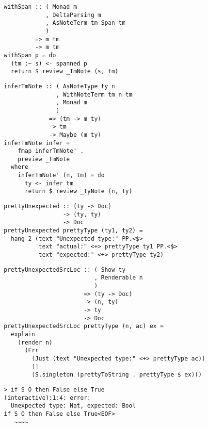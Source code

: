 \documentclass{beamer}
\begin{document}
\begin{frame}[fragile]
  \begin{verbatim}
withSpan :: ( Monad m
            , DeltaParsing m
            , AsNoteTerm tm Span tm
            )
         => m tm
         -> m tm
withSpan p = do
  (tm :~ s) <- spanned p
  return $ review _TmNote (s, tm)
  \end{verbatim}
\end{frame} 

\begin{frame}[fragile]
  \begin{verbatim}
inferTmNote :: ( AsNoteType ty n
               , WithNoteTerm tm n tm
               , Monad m
               )
             => (tm -> m ty)
             -> tm
             -> Maybe (m ty)
inferTmNote infer =
    fmap inferTmNote' .
    preview _TmNote
  where
    inferTmNote' (n, tm) = do
      ty <- infer tm
      return $ review _TyNote (n, ty)
  \end{verbatim}
\end{frame} 

\begin{frame}[fragile]
  \begin{verbatim}
prettyUnexpected :: (ty -> Doc)
                 -> (ty, ty)
                 -> Doc
prettyUnexpected prettyType (ty1, ty2) =
  hang 2 (text "Unexpected type:" PP.<$>
          text "actual:" <+> prettyType ty1 PP.<$>
          text "expected:" <+> prettyType ty2)
  \end{verbatim}
\end{frame} 

\begin{frame}[fragile]
  \begin{verbatim}
prettyUnexpectedSrcLoc :: ( Show ty
                          , Renderable n
                          )
                       => (ty -> Doc)
                       -> (n, ty)
                       -> ty
                       -> Doc
prettyUnexpectedSrcLoc prettyType (n, ac) ex =
  explain
    (render n)
      (Err 
        (Just (text "Unexpected type:" <+> prettyType ac)) 
        [] 
        (S.singleton (prettyToString . prettyType $ ex)))
  \end{verbatim}
\end{frame} 

\begin{frame}[fragile]
\begin{verbatim}
> if S O then False else True
(interactive):1:4: error: 
  Unexpected type: Nat, expected: Bool
if S O then False else True<EOF>
   ~~~~
\end{verbatim}
\end{frame} 
\end{document}
